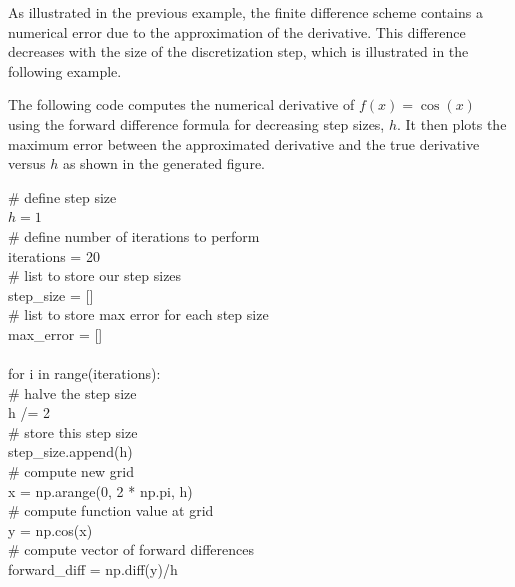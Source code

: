 As illustrated in the previous example, the finite difference scheme contains a numerical error due to the approximation of the derivative. This difference decreases with the size of the discretization step, which is illustrated in the following example.

\begin{example}
The following code computes the numerical derivative of $f(x)=\cos(x)$ using the forward difference formula for decreasing step sizes, $h$. It then plots the maximum error between the approximated derivative and the true derivative versus $h$ as shown in the generated figure.

\begin{boxB}
\# define step size\\
$h = 1$\\
\# define number of iterations to perform\\
iterations = 20 \\
\# list to store our step sizes\\
step\_size = [] \\
\# list to store max error for each step size\\
max\_error = [] \\
\\
for i in range(iterations):\\
    \hspace*{0.5cm}\# halve the step size\\
    \hspace*{0.5cm}h /= 2 \\
    \hspace*{0.5cm}\# store this step size\\
    \hspace*{0.5cm}step\_size.append(h) \\
    \hspace*{0.5cm}\# compute new grid\\
    \hspace*{0.5cm}x = np.arange(0, 2 * np.pi, h) \\
    \hspace*{0.5cm}\# compute function value at grid\\
    \hspace*{0.5cm}y = np.cos(x) \\
    \hspace*{0.5cm}\# compute vector of forward differences\\
    \hspace*{0.5cm}forward\_diff = np.diff(y)/h \\

\end{boxB}
\end{example}
